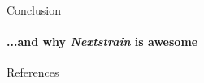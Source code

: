 \documentclass{beamer}
\begin{document}
\begin{darkframes}
    \begin{frame}{Conclusion}
      \framesubtitle{...and why \textit{Nextstrain} is awesome}
    \end{frame}

    \begin{frame}{References}
      \framesubtitle{}
      
    \end{frame}

  \end{darkframes}
\end{document}
